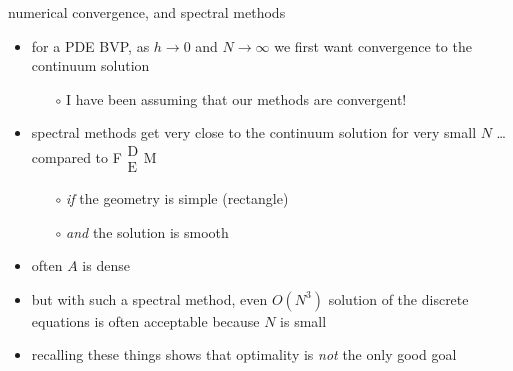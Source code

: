 \documentclass[hide notes,intlimits,usenames,dvipsnames]{beamer}
\newcommand{\FM}{F$\begin{smallmatrix} \text{D} \\ \text{E} \end{smallmatrix}$M\xspace}
\begin{document}
\begin{frame}{numerical convergence, and spectral methods}
\begin{itemize}
\item for a PDE BVP, as $h\to 0$ and $N\to\infty$ we \alert{first want convergence to the continuum solution}
    \begin{itemize}
    \item[$\circ$] I have been assuming that our methods are convergent!
    \end{itemize}
\item spectral methods get very close to the continuum solution for very small $N$ \hfill \scriptsize \dots compared to \FM \normalsize
    \begin{itemize}
    \item[$\circ$] \emph{if} the geometry is simple (rectangle)
    \item[$\circ$] \emph{and} the solution is smooth
    \end{itemize}
\item often $A$ is dense
\item but with such a spectral method, even $O(N^3)$ solution of the discrete equations is often acceptable because $N$ is small

\bigskip
\item recalling these things shows that optimality is \emph{not} the only good goal
\end{itemize}
\end{frame}
\end{document}
